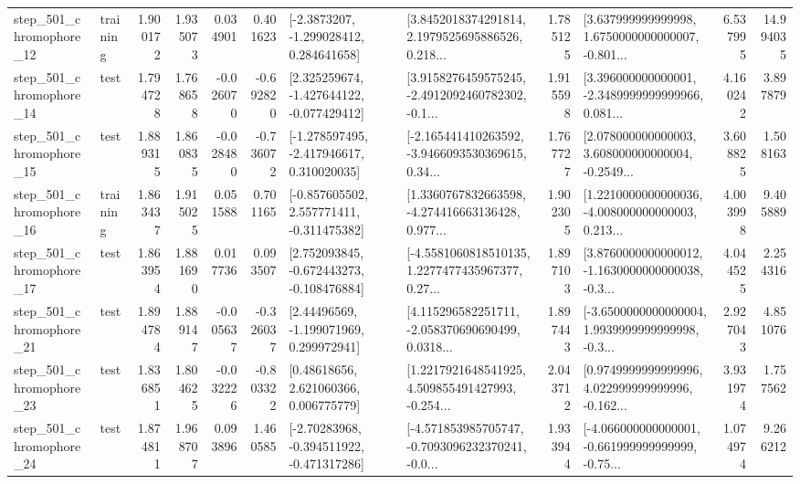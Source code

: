 \begin{tabular}{llrrrrllrlrr}
  step\_501\_chromophore\_12 &  training &      1.900172 &    1.935073 &      0.034901 &  0.401623 &     [-2.3873207, -1.299028412, 0.284641658] &  [3.8452018374291814, 2.1979525695886526, 0.218... &       1.785125 &  [3.637999999999998, 1.6750000000000007, -0.801... &            6.537995 &         14.994035 \\
  step\_501\_chromophore\_14 &      test &      1.794728 &    1.768658 &     -0.026070 & -0.692820 &   [2.325259674, -1.427644122, -0.077429412] &  [3.9158276459575245, -2.4912092460782302, -0.1... &       1.915598 &  [3.396000000000001, -2.3489999999999966, 0.081... &            4.160242 &          3.897879 \\
  step\_501\_chromophore\_15 &      test &      1.889315 &    1.860835 &     -0.028480 & -0.736072 &   [-1.278597495, -2.417946617, 0.310020035] &  [-2.165441410263592, -3.9466093530369615, 0.34... &       1.767727 &  [2.078000000000003, 3.608000000000004, -0.2549... &            3.608825 &          1.508163 \\
  step\_501\_chromophore\_16 &  training &      1.863437 &    1.915025 &      0.051588 &  0.701165 &   [-0.857605502, 2.557771411, -0.311475382] &  [1.3360767832663598, -4.274416663136428, 0.977... &       1.902305 &  [1.2210000000000036, -4.008000000000003, 0.213... &            4.003998 &          9.405889 \\
  step\_501\_chromophore\_17 &      test &      1.863954 &    1.881690 &      0.017736 &  0.093507 &   [2.752093845, -0.672443273, -0.108476884] &  [-4.5581060818510135, 1.2277477435967377, 0.27... &       1.897103 &  [3.8760000000000012, -1.1630000000000038, -0.3... &            4.044525 &          2.254316 \\
  step\_501\_chromophore\_21 &      test &      1.894784 &    1.889147 &     -0.005637 & -0.326037 &     [2.44496569, -1.199071969, 0.299972941] &  [4.115296582251711, -2.058370690690499, 0.0318... &       1.897443 &  [-3.6500000000000004, 1.9939999999999998, -0.3... &            2.927043 &          4.851076 \\
  step\_501\_chromophore\_23 &      test &      1.836851 &    1.804625 &     -0.032226 & -0.803322 &      [0.48618656, 2.621060366, 0.006775779] &  [1.2217921648541925, 4.509855491427993, -0.254... &       2.043712 &  [0.9749999999999996, 4.022999999999996, -0.162... &            3.931974 &          1.757562 \\
  step\_501\_chromophore\_24 &      test &      1.874811 &    1.968707 &      0.093896 &  1.460585 &   [-2.70283968, -0.394511922, -0.471317286] &  [-4.571853985705747, -0.7093096232370241, -0.0... &       1.933944 &  [-4.066000000000001, -0.661999999999999, -0.75... &            1.074974 &          9.266212 \\

\end{tabular}
